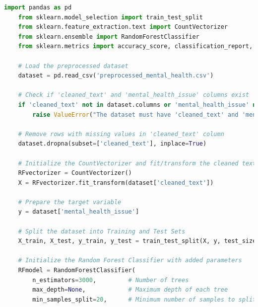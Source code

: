 \begin{tcolorbox}[colback=gray!5!white, colframe=gray!80!black, boxrule=0.5pt, title=Random Forest Classifier Implementation]
    \begin{lstlisting}[language=Python]
    import pandas as pd
    from sklearn.model_selection import train_test_split
    from sklearn.feature_extraction.text import CountVectorizer
    from sklearn.ensemble import RandomForestClassifier
    from sklearn.metrics import accuracy_score, classification_report, confusion_matrix

    # Load the preprocessed dataset
    dataset = pd.read_csv('preprocessed_mental_health.csv')

    # Check if 'cleaned_text' and 'mental_health_issue' columns exist
    if 'cleaned_text' not in dataset.columns or 'mental_health_issue' not in dataset.columns:
        raise ValueError("The dataset must have 'cleaned_text' and 'mental_health_issue' columns.")

    # Remove rows with missing values in 'cleaned_text' column
    dataset.dropna(subset=['cleaned_text'], inplace=True)

    # Initialize the CountVectorizer and fit/transform the cleaned text
    RFvectorizer = CountVectorizer()
    X = RFvectorizer.fit_transform(dataset['cleaned_text'])

    # Prepare the target variable
    y = dataset['mental_health_issue']

    # Split the dataset into Training and Test Sets
    X_train, X_test, y_train, y_test = train_test_split(X, y, test_size=0.2, random_state=42)

    # Initialize the Random Forest Classifier with added parameters
    RFmodel = RandomForestClassifier(
        n_estimators=3000,         # Number of trees
        max_depth=None,            # Maximum depth of each tree
        min_samples_split=20,      # Minimum number of samples to split a node

\end{lstlisting}
\end{tcolorbox}

